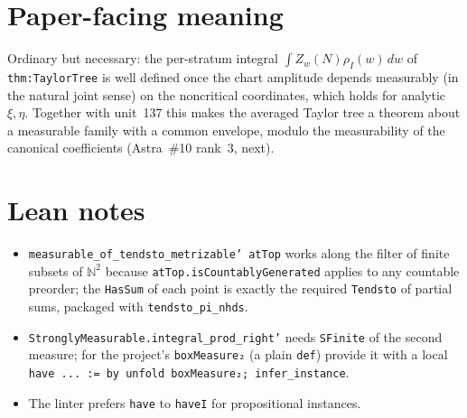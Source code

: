 \documentclass[11pt]{article}
\begin{document}
\section{Paper-facing meaning}

Ordinary but necessary: the per-stratum integral $\int Z_w(N)\rho_I(w)\,dw$ of \texttt{thm:TaylorTree}
is well defined once the chart amplitude depends measurably (in the natural joint sense) on the
noncritical coordinates, which holds for analytic $\xi,\eta$. Together with unit~137 this makes the
averaged Taylor tree a theorem about a measurable family with a common envelope, modulo the
measurability of the canonical coefficients (Astra~\#10 rank~3, next).

\section{Lean notes}

\begin{itemize}
\item \texttt{measurable\_of\_tendsto\_metrizable' atTop} works along the filter of finite subsets
of $\mathbb N^2$ because \texttt{atTop.isCountablyGenerated} applies to any countable preorder; the
\texttt{HasSum} of each point is exactly the required \texttt{Tendsto} of partial sums, packaged with
\texttt{tendsto\_pi\_nhds}.
\item \texttt{StronglyMeasurable.integral\_prod\_right'} needs \texttt{SFinite} of the second
measure; for the project's \texttt{boxMeasure₂} (a plain \texttt{def}) provide it with a local
\texttt{have ... := by unfold boxMeasure₂; infer\_instance}.
\item The linter prefers \texttt{have} to \texttt{haveI} for propositional instances.
\end{itemize}
\end{document}
